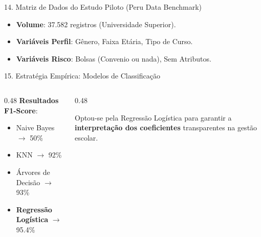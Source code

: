 \documentclass[10pt, aspectratio=169]{beamer}
\begin{document}
\begin{frame}{14. Matriz de Dados do Estudo Piloto (Peru Data Benchmark)}
    \begin{tcolorbox}[enhanced,title=Amostra e Dimensões,colback=black!30,colframe=ArkosGreen,fonttitle=\bfseries]
        \begin{itemize}
            \item \textbf{Volume}: 37.582 registros (Universidade Superior).
            \item \textbf{Variáveis Perfil}: Gênero, Faixa Etária, Tipo de Curso.
            \item \textbf{Variáveis Risco}: Bolsas (Convenio ou nada), Sem Atributos.
        \end{itemize}
    \end{tcolorbox}
\end{frame}

\begin{frame}{15. Estratégia Empírica: Modelos de Classificação}
    \begin{columns}[onlytextwidth]
        \begin{column}{0.48\textwidth}
            \textbf{Resultados F1-Score}:
            \begin{itemize}
                \item Naive Bayes $\rightarrow$ 50\%
                \item KNN $\rightarrow$ 92\%
                \item Árvores de Decisão $\rightarrow$ 93\%
                \item \textbf{Regressão Logística} $\rightarrow$ 95.4\%
            \end{itemize}
        \end{column}
        \begin{column}{0.48\textwidth}
            \begin{tcolorbox}[enhanced,title=Justificativa do Modelo,colback=black!30,colframe=cyan,fonttitle=\bfseries]
                Optou-se pela Regressão Logística para garantir a \textbf{interpretação dos coeficientes} transparentes na gestão escolar.
            \end{tcolorbox}
        \end{column}
    \end{columns}
\end{frame}
\end{document}
